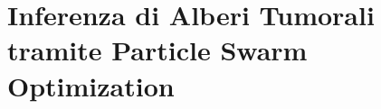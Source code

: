 \chapter{Inferenza di Alberi Tumorali tramite Particle Swarm Optimization}
\label{chap:pso}


\subsection{}
